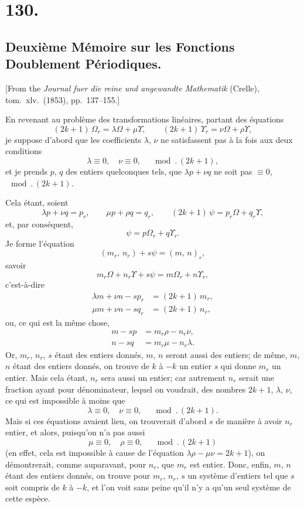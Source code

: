 \documentclass[11pt,a4paper]{article}
\theoremstyle{definition}
\begin{document}
\section*{130.}
\subsection*{Deuxi\`eme M\'emoire sur les Fonctions Doublement P\'eriodiques.}

[From the \textit{Journal fuer die reine und angewandte Mathematik} (Crelle),
tom.\ xlv.\ (1853), pp.\ 137--155.]

\medskip

En revenant au probl\`eme des transformations lin\'eaires, partant des \'equations
\[
(2k+1)\,\Omega_r = \lambda\Omega + \mu\Upsilon,
\qquad
(2k+1)\,\Upsilon_r = \nu\Omega + \rho\Upsilon,
\]
je suppose d'abord que les coefficients $\lambda$, $\nu$ ne satisfassent pas
\`a la fois aux deux conditions
\[
\lambda \equiv 0,\quad \nu \equiv 0, \quad \mod.\,(2k+1),
\]
et je prends $p$, $q$ des entiers quelconques tels, que $\lambda p + \nu q$
ne soit pas $\equiv 0$, $\mod.\,(2k+1)$.

Cela \'etant, soient
\[
\lambda p + \nu q = p_r, \qquad
\mu p + \rho q = q_r, \qquad
(2k+1)\,\psi = p_r\Omega + q_r\Upsilon,
\]
et, par cons\'equent,
\[
\psi = p\Omega_r + q\Upsilon_r.
\]
Je forme l'\'equation
\[
(m_r,\, n_r) + s\psi = (m,\, n)_r,
\]
savoir
\[
m_r\Omega + n_r\Upsilon + s\psi = m\Omega_r + n\Upsilon_r,
\]
c'est-\`a-dire
\begin{align*}
\lambda m + \nu n - sp_r &= (2k+1)\,m_r, \\
\mu m + \nu n - sq_r &= (2k+1)\,n_r,
\end{align*}
ou, ce qui est la m\^eme chose,
\begin{align*}
m - sp &= m_r\rho - n_r\nu, \\
n - sq &= m_r\mu - n_r\lambda.
\end{align*}
Or, $m_r$, $n_r$, $s$ \'etant des entiers donn\'es, $m$, $n$ seront aussi des
entiers; de m\^eme, $m$, $n$ \'etant des entiers donn\'es, on trouve de $k$ \`a
$-k$ un entier $s$ qui donne $m_r$ un entier. Mais cela \'etant, $n_r$ sera
aussi un entier; car autrement $n_r$ serait une fraction ayant pour
d\'enominateur, lequel on voudrait, des nombres $2k+1$, $\lambda$, $\nu$, ce qui
est impossible \`a moins que
\[
\lambda \equiv 0,\quad \nu \equiv 0, \quad \mod.\,(2k+1).
\]
Mais si ces \'equations avaient lieu, on trouverait d'abord $s$ de mani\`ere
\`a avoir $n_r$ entier, et alors, puisqu'on n'a pas aussi
\[
\mu \equiv 0,\quad \rho \equiv 0, \quad \mod.\,(2k+1)
\]
(en effet, cela est impossible \`a cause de l'\'equation
$\lambda\rho - \mu\nu = 2k+1$), on d\'emontrerait, comme auparavant, pour
$n_r$, que $m_r$ est entier. Donc, enfin, $m$, $n$ \'etant des entiers donn\'es,
on trouve pour $m_r$, $n_r$, $s$ un syst\`eme d'entiers tel que $s$ soit
compris de $k$ \`a $-k$, et l'on voit sans peine qu'il n'y a qu'un seul
syst\`eme de cette esp\`ece.
\end{document}
